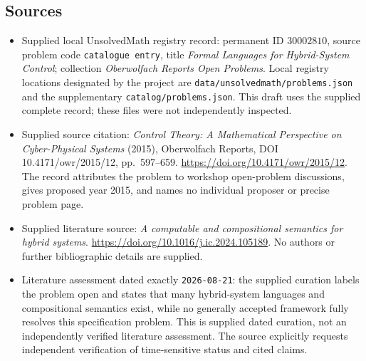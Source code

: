\documentclass[11pt]{article}
\begin{document}
\subsection{Sources}
\begin{itemize}
\item Supplied local UnsolvedMath registry record: permanent ID \(30002810\), source problem code \texttt{catalogue entry}, title \emph{Formal Languages for Hybrid-System Control}; collection \emph{Oberwolfach Reports Open Problems}. Local registry locations designated by the project are \texttt{data/unsolvedmath/problems.json} and the supplementary \texttt{catalog/problems.json}. This draft uses the supplied complete record; these files were not independently inspected.
\item Supplied source citation: \emph{Control Theory: A Mathematical Perspective on Cyber-Physical Systems} (2015), Oberwolfach Reports, DOI 10.4171/owr/2015/12, pp.\ 597--659. \url{https://doi.org/10.4171/owr/2015/12}. The record attributes the problem to workshop open-problem discussions, gives proposed year 2015, and names no individual proposer or precise problem page.
\item Supplied literature source: \emph{A computable and compositional semantics for hybrid systems}. \url{https://doi.org/10.1016/j.ic.2024.105189}. No authors or further bibliographic details are supplied.
\item Literature assessment dated exactly \texttt{2026-08-21}: the supplied curation labels the problem open and states that many hybrid-system languages and compositional semantics exist, while no generally accepted framework fully resolves this specification problem. This is supplied dated curation, not an independently verified literature assessment. The source explicitly requests independent verification of time-sensitive status and cited claims.
\end{itemize}
\end{document}
